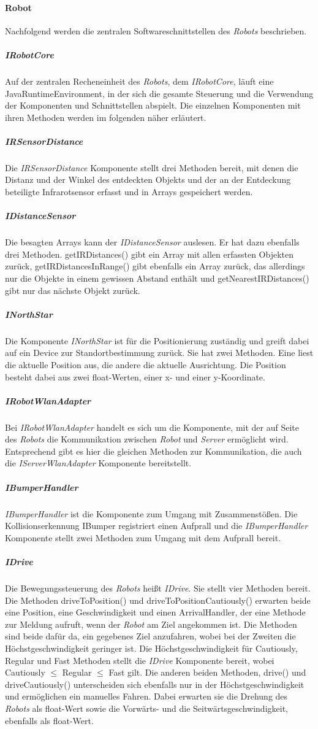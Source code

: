     \paragraph{Robot}\label{robot}
    		Nachfolgend werden die zentralen Softwareschnittstellen des \emph{Robots} beschrieben.
    	\subparagraph{IRobotCore}\label{irobotcore}
    		Auf der zentralen Recheneinheit des \emph{Robots}, dem \emph{IRobotCore}, läuft eine JavaRuntimeEnvironment, in der sich die gesamte Steuerung und die Verwendung der Komponenten und Schnittstellen abspielt. Die einzelnen Komponenten mit ihren Methoden werden im folgenden näher erläutert.
    	\subparagraph{IRSensorDistance}\label{irsensordistance}
    		Die \emph{IRSensorDistance} Komponente stellt drei Methoden bereit, mit denen die Distanz und der Winkel des entdeckten Objekts und der an der Entdeckung beteiligte Infrarotsensor erfasst und in Arrays gespeichert werden.
    	\subparagraph{IDistanceSensor}\label{idistancesensor}
    		Die besagten Arrays kann der \emph{IDistanceSensor} auslesen. Er hat dazu ebenfalls drei Methoden. getIRDistances() gibt ein Array mit allen erfassten Objekten zurück, getIRDistancesInRange() gibt ebenfalls ein Array zurück, das allerdings nur die Objekte in einem gewissen Abstand enthält und getNearestIRDistances() gibt nur das nächste Objekt zurück.
    	\subparagraph{INorthStar}\label{inorthstar}
    		Die Komponente \emph{INorthStar} ist für die Positionierung zuständig und greift dabei auf ein Device zur Standortbestimmung zurück. Sie hat zwei Methoden. Eine liest die aktuelle Position aus, die andere die aktuelle Ausrichtung. Die Position besteht dabei aus zwei float-Werten, einer x- und einer y-Koordinate.
    	\subparagraph{IRobotWlanAdapter}\label{irobotwlanadapter}
    		Bei \emph{IRobotWlanAdapter} handelt es sich um die Komponente, mit der auf Seite des \emph{Robots} die Kommunikation zwischen \emph{Robot} und \emph{Server} ermöglicht wird. Entsprechend gibt es hier die gleichen Methoden zur Kommunikation, die auch die \emph{IServerWlanAdapter} Komponente bereitstellt.
    	\subparagraph{IBumperHandler}\label{ibumperhandler}
    		\emph{IBumperHandler} ist die Komponente zum Umgang mit Zusammenstößen. Die Kollisionserkennung IBumper registriert einen Aufprall und die \emph{IBumperHandler} Komponente stellt zwei Methoden zum Umgang mit dem Aufprall bereit.
    	\subparagraph{IDrive}\label{idrive}
    		Die Bewegungssteuerung des \emph{Robots} heißt \emph{IDrive}. Sie stellt vier Methoden bereit. Die Methoden driveToPosition() und driveToPositionCautiously() erwarten beide eine Position, eine Geschwindigkeit und einen ArrivalHandler, der eine Methode zur Meldung aufruft, wenn der \emph{Robot} am Ziel angekommen ist. Die Methoden sind beide dafür da, ein gegebenes Ziel anzufahren, wobei bei der Zweiten die Höchstgeschwindigkeit geringer ist. Die Höchstgeschwindigkeit für Cautiously, Regular und Fast Methoden stellt die \emph{IDrive} Komponente bereit, wobei Cautiously $\leq$ Regular $\leq$ Fast gilt. Die anderen beiden Methoden, drive() und driveCautiously() unterscheiden sich ebenfalls nur in der Höchstgeschwindigkeit und ermöglichen ein manuelles Fahren. Dabei erwarten sie die Drehung des \emph{Robots} als float-Wert sowie die Vorwärts- und die Seitwärtsgeschwindigkeit, ebenfalls als float-Wert.
